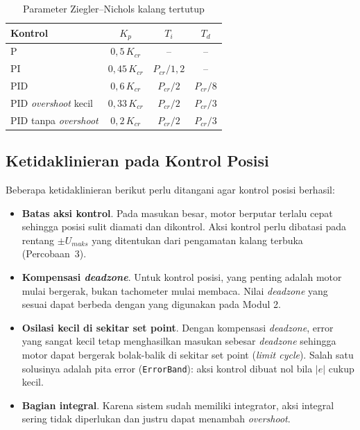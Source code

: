 \documentclass[11pt,a4paper]{article}
\begin{document}
\begin{table}[H]
\centering
\caption{Parameter Ziegler--Nichols kalang tertutup}
\label{tab:zn_tertutup}
\begin{tabular}{|l|c|c|c|}
\hline
\textbf{Kontrol} & $K_p$ & $T_i$ & $T_d$ \\
\hline
P & $0{,}5\,K_{cr}$ & -- & -- \\
PI & $0{,}45\,K_{cr}$ & $P_{cr}/1{,}2$ & -- \\
PID & $0{,}6\,K_{cr}$ & $P_{cr}/2$ & $P_{cr}/8$ \\
PID \textit{overshoot} kecil & $0{,}33\,K_{cr}$ & $P_{cr}/2$ & $P_{cr}/3$ \\
PID tanpa \textit{overshoot} & $0{,}2\,K_{cr}$ & $P_{cr}/2$ & $P_{cr}/3$ \\
\hline
\end{tabular}
\end{table}

\subsection{Ketidaklinieran pada Kontrol Posisi}
Beberapa ketidaklinieran berikut perlu ditangani agar kontrol posisi berhasil:
\begin{itemize}
\item \textbf{Batas aksi kontrol}. Pada masukan besar, motor berputar terlalu cepat sehingga posisi sulit diamati dan dikontrol. Aksi kontrol perlu dibatasi pada rentang $\pm U_{maks}$ yang ditentukan dari pengamatan kalang terbuka (Percobaan~3).
\item \textbf{Kompensasi \textit{deadzone}}. Untuk kontrol posisi, yang penting adalah motor mulai bergerak, bukan tachometer mulai membaca. Nilai \textit{deadzone} yang sesuai dapat berbeda dengan yang digunakan pada Modul 2.
\item \textbf{Osilasi kecil di sekitar set point}. Dengan kompensasi \textit{deadzone}, error yang sangat kecil tetap menghasilkan masukan sebesar \textit{deadzone} sehingga motor dapat bergerak bolak-balik di sekitar set point (\textit{limit cycle}). Salah satu solusinya adalah pita error (\texttt{ErrorBand}): aksi kontrol dibuat nol bila $|e|$ cukup kecil.
\item \textbf{Bagian integral}. Karena sistem sudah memiliki integrator, aksi integral sering tidak diperlukan dan justru dapat menambah \textit{overshoot}.
\end{itemize}
\end{document}
